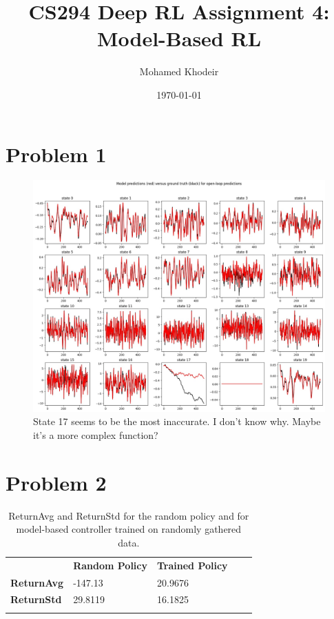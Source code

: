 \documentclass[a4paper]{article}
\title{CS294 Deep RL Assignment 4: Model-Based RL}
\author{Mohamed Khodeir}
\date{\today}
\begin{document}
\maketitle


\section*{Problem 1}
\begin{figure}[H]
\centering
\includegraphics[width=1\textwidth]{p1.jpg}
\caption{State 17 seems to be the most inaccurate. I don't know why. Maybe it's a more complex function?}
\end{figure}

\pagebreak


\section*{Problem 2}
\begin{table}[H]
\begin{tabular}{lllll}
\cline{2-3}
\multicolumn{1}{l|}{}                    & \multicolumn{1}{l|}{\textbf{Random Policy}} & \multicolumn{1}{l|}{\textbf{Trained Policy}} &  &  \\ \cline{1-3}
\multicolumn{1}{|l|}{\textbf{ReturnAvg}} & \multicolumn{1}{l|}{-147.13}                & \multicolumn{1}{l|}{20.9676}                 &  &  \\ \cline{1-3}
\multicolumn{1}{|l|}{\textbf{ReturnStd}} & \multicolumn{1}{l|}{29.8119}                & \multicolumn{1}{l|}{16.1825}                 &  &  \\ \cline{1-3}
                                         &                                             &                                              &  & 
\end{tabular}
\caption{ReturnAvg and ReturnStd for the random policy and for
model-based controller trained on randomly gathered data.}
\end{table}
\end{document}
